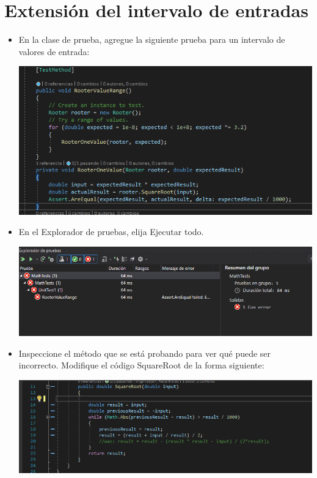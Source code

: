 \section{Extensión del intervalo de entradas} 

\begin{itemize}

\item En la clase de prueba, agregue la siguiente prueba para un intervalo de valores de entrada:
\begin{center}
\includegraphics[width=\columnwidth]{images/10}\newline
\end{center}
\item En el Explorador de pruebas, elija Ejecutar todo.
\begin{center}
\includegraphics[width=\columnwidth]{images/11}\newline
\end{center}
\item Inspeccione el método que se está probando para ver qué puede ser incorrecto. Modifique el
código SquareRoot de la forma siguiente:
\begin{center}
\includegraphics[width=\columnwidth]{images/002}\newline

\end{center}
\end{itemize}

